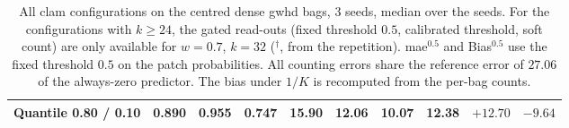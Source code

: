 \documentclass[12pt,parskip = half, DIV=classic,listof=totoc]{scrartcl}
\begin{document}
\begin{table}[htbp]
\begin{tabular}{@{}lccccccccc@{}}
						Quantile 0.80 / 0.10 & 0.890 & 0.955 & 0.747 & 15.90 & 12.06 & 10.07 & 12.38 & $+12.70$ & $-9.64$ \\
						\bottomrule
					\end{tabular}
					\caption[All \acs*{clam} configurations on the centred dense \acs*{gwhd} bags, 3 seeds, median over the seeds]{All \ac{clam} configurations on the centred dense \ac{gwhd} bags, 3 seeds, median over the seeds.
					For the configurations with $k\ge24$, the gated read-outs (fixed threshold $0.5$, calibrated threshold, soft count) are only available for $w=0.7$, $k=32$
					($^\dagger$, from the repetition). \acs*{mae}$^{0.5}$ and Bias$^{0.5}$ use the fixed threshold $0.5$ on the patch probabilities. All counting
					errors share the reference error of $27.06$ of the always-zero predictor. The bias under $1/K$ is recomputed from the
					per-bag counts.}
					\label{tab:clam_results}
				\end{table}
\end{document}

